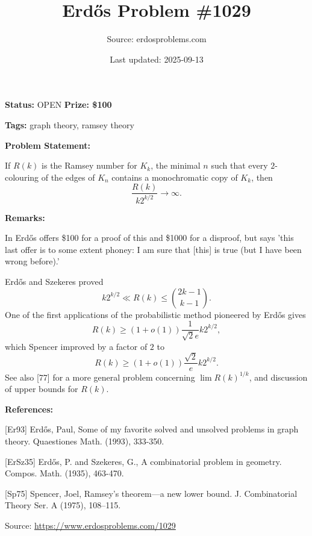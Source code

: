 \documentclass{article}
\title{Erd\H{o}s Problem \#1029}
\date{Last updated: 2025-09-13}
\author{Source: erdosproblems.com}
\begin{document}
\maketitle

\noindent\textbf{Status:} OPEN \quad \textbf{Prize: \$100}

\noindent\textbf{Tags:} graph theory, ramsey theory

\medskip
\noindent\textbf{Problem Statement:}

If $R(k)$ is the Ramsey number for $K_k$, the minimal $n$ such that every $2$-colouring of the edges of $K_n$ contains a monochromatic copy of $K_k$, then\[\frac{R(k)}{k2^{k/2}}\to \infty.\]

\bigskip
\noindent\textbf{Remarks:}

In \cite{Er93} Erd\H{o}s offers \$100 for a proof of this and \$1000 for a disproof, but says 'this last offer is to some extent phoney: I am sure that [this] is true (but I have been wrong before).'

Erd\H{o}s and Szekeres \cite{ErSz35} proved\[k2^{k/2} \ll R(k) \leq \binom{2k-1}{k-1}.\]One of the first applications of the probabilistic method pioneered by Erd\H{o}s gives\[R(k) \geq (1+o(1))\frac{1}{\sqrt{2}e}k2^{k/2},\]which Spencer \cite{Sp75} improved by a factor of $2$ to\[R(k) \geq (1+o(1))\frac{\sqrt{2}}{e}k2^{k/2}.\]See also [77] for a more general problem concerning $\lim R(k)^{1/k}$, and discussion of upper bounds for $R(k)$.

\bigskip
\noindent\textbf{References:}

[Er93] Erd\H{o}s, Paul, Some of my favorite solved and unsolved problems in graph theory. Quaestiones Math. (1993), 333-350.
 
 [ErSz35] Erd\H{o}s, P. and Szekeres, G., A combinatorial problem in geometry. Compos. Math. (1935), 463-470.
 
 [Sp75] Spencer, Joel, Ramsey's theorem---a new lower bound. J. Combinatorial Theory Ser. A (1975), 108--115.

\bigskip
\noindent\small{Source: \url{https://www.erdosproblems.com/1029}}
\end{document}
